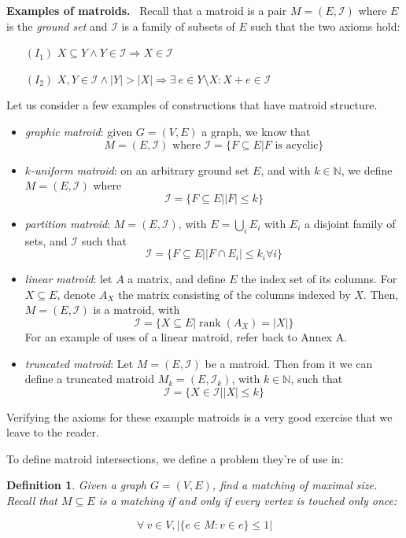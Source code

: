 \documentclass{report}
\newcommand{\NN}{\ensuremath{\mathbb{N}}}
\newcommand{\II}{\ensuremath{\mathcal{I}}}
\newcommand{\aparte}[2]{
    \vspace{0.5em}
    \begin{adjustwidth}{20pt}{0pt}
        \begin{boxxx}
            \textbf{#1.}\ #2
        \end{boxxx}
    \end{adjustwidth}
    \vspace{0.75em}
}
\newtheorem{definition}{Definition}
\begin{document}
  \aparte{Examples of matroids}{
    Recall that a matroid is a pair $M = (E, \II)$ where $E$ is the \emph{ground set} and $\II$ is a family of subsets of $E$ such that the two axioms hold:
    \begin{itemize}
      \item[$(I_1)$] $X \subseteq Y \land Y \in \II \Rightarrow X \in \II$
      \item[$(I_2)$] $X, Y \in \II \land |Y| > |X| \Rightarrow \exists \ e \in Y \setminus X : X + e \in \II$
    \end{itemize}

    Let us consider a few examples of constructions that have matroid structure.

    \begin{itemize}
      \item \emph{graphic matroid}: given $G = (V, E)$ a graph, we know that \[M = (E, \II) \text{ where } \II = \{F \subseteq E | F \text{ is acyclic}\}\]
      \item \emph{$k$-uniform matroid}: on an arbitrary ground set $E$, and with $k \in \NN$, we define $M = (E, \II)$ where \[\II = \{F \subseteq E | |F| \leqslant k\}\]
      \item \emph{partition matroid}: $M = (E, \II)$, with $E = \bigcup_i E_i$ with $E_i$ a disjoint family of sets, and $\II$ such that \[\II = \{F \subseteq E | |F \cap E_i| \leqslant k_i \forall i\}\]
      \item \emph{linear matroid}: let $A$ a matrix, and define $E$ the index set of its columns. For $X \subseteq E$, denote $A_X$ the matrix consisting of the columns indexed by $X$. Then, $M = (E, \II)$ is a matroid, with \[\II = \{X \subseteq E | \operatorname{rank}(A_X) = |X|\}\] For an example of uses of a linear matroid, refer back to Annex A.
      \item \emph{truncated matroid}: Let $M = (E, \II)$ be a matroid. Then from it we can define a truncated matroid $M_k = (E, \II_k)$, with $k \in \NN$, such that \[\II = \{X \in \II | |X| \leqslant k\}\]
    \end{itemize}

    Verifying the axioms for these example matroids is a very good exercise that we leave to the reader.
  }

  To define matroid intersections, we define a problem they're of use in:
  \begin{definition}
    Given a graph $G = (V, E)$, find a matching of maximal size. Recall that $M \subseteq E$ is a matching if and only if every vertex is touched only once:

    \[
      \forall \ v \in V, \left|\{e \in M : v \in e\} \leqslant 1\right|
    \]
  \end{definition}
\end{document}
